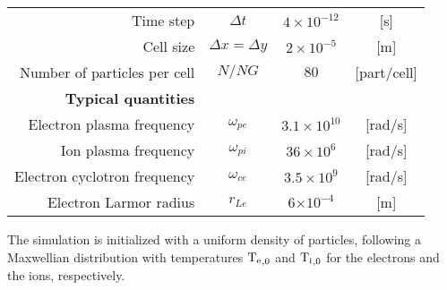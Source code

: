 \begin{table}[htbp]
\begin{tabular}{@{}r c c c@{}}
          Time step & $\Delta t  $                      & $4 \times 10^{-12}$ & [{s}] \\
          Cell size & $\Delta x = \Delta y$ & $2 \times 10^{-5}$  & [{m}] \\
          Number of particles per cell & $N/NG      $                      & $80$                & [{part/cell}] \\
          \midrule
          {\bf Typical quantities} &  &  &  \\ 
          Electron plasma frequency & $\omega_{pe}$               & $3.1 \times 10^{10} $  & [rad/s]\\
          Ion plasma frequency & $\omega_{pi}$               & $36 \times 10^{6} $  & [rad/s]\\
          Electron cyclotron frequency & $\omega_{ce}$               &  $3.5\times 10^{9}$  & [rad/s] \\
          Electron Larmor radius & $r_{Le}$                    & 6$\times 10^{-4}$    & [m] \\
          \bottomrule
       \end{tabular}
    \end{table}
  
  
  The simulation is initialized with a uniform density of particles, following a Maxwellian distribution with temperatures $\mathrm{T_e}_{,0}$ and $\mathrm{T_i}_{,0}$ for the electrons and the ions, respectively.
  
  
